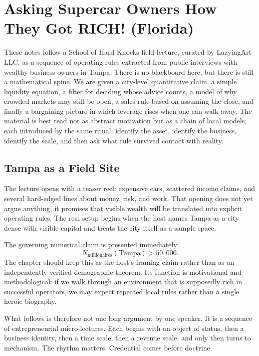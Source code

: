 \chapter{Asking Supercar Owners How They Got RICH! (Florida)}

These notes follow a School of Hard Knocks field lecture, curated by LazyingArt LLC, as a sequence of operating rules extracted from public interviews with wealthy business owners in Tampa. There is no blackboard here, but there is still a mathematical spine. We are given a city-level quantitative claim, a simple liquidity equation, a filter for deciding whose advice counts, a model of why crowded markets may still be open, a sales rule based on assuming the close, and finally a bargaining picture in which leverage rises when one can walk away. The material is best read not as abstract motivation but as a chain of local models, each introduced by the same ritual: identify the asset, identify the business, identify the scale, and then ask what rule survived contact with reality.

\section{Tampa as a Field Site}

The lecture opens with a teaser reel: expensive cars, scattered income claims, and several hard-edged lines about money, risk, and work. That opening does not yet argue anything; it promises that visible wealth will be translated into explicit operating rules. The real setup begins when the host names Tampa as a city dense with visible capital and treats the city itself as a sample space.

The governing numerical claim is presented immediately:
\begin{equation}
N_{\text{millionaires}}(\text{Tampa}) > 50{,}000.
\end{equation}
The chapter should keep this as the host's framing claim rather than as an independently verified demographic theorem. Its function is motivational and methodological: if we walk through an environment that is supposedly rich in successful operators, we may expect repeated local rules rather than a single heroic biography.

What follows is therefore not one long argument by one speaker. It is a sequence of entrepreneurial micro-lectures. Each begins with an object of status, then a business identity, then a time scale, then a revenue scale, and only then turns to mechanism. The rhythm matters. Credential comes before doctrine.

